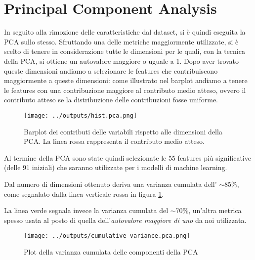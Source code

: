 \section{Principal Component Analysis}
In seguito alla rimozione delle caratteristiche dal dataset, si è quindi eseguita 
la PCA sullo stesso. 
Sfruttando una delle metriche maggiormente utilizzate, si è scelto di tenere 
in considerazione tutte le dimensioni per le quali, con la tecnica della PCA, 
si ottiene un autovalore maggiore o uguale a 1.
Dopo aver trovato queste dimensioni andiamo a selezionare le features che 
contribuiscono maggiormente a queste dimensioni: come illustrato nel barplot 
andiamo a tenere le features con una contribuzione maggiore al contributo medio 
atteso, ovvero il contributo atteso se la distribuzione delle contribuzioni fosse
uniforme.   

\begin{figure}[H]
    \centering
    \texttt{[image: ../outputs/hist.pca.png]}
    \caption{Barplot dei contributi delle variabili rispetto alle dimensioni 
    della PCA. La linea rossa rappresenta il contributo medio atteso.}
\end{figure}

Al termine della PCA sono state quindi selezionate le 55 features più 
significative (delle 91 iniziali) che saranno utilizzate per i 
modelli di machine learning.

Dal numero di dimensioni ottenuto deriva una varianza cumulata dell'
$\sim 85\%$, come segnalato dalla linea verticale rossa in figura \ref{fig:var}.

La linea verde segnala invece la varianza cumulata del $\sim 70\%$, un'altra
metrica spesso usata al posto di quella dell'\textit{autovalore maggiore di uno} 
da noi utilizzata.

\begin{figure}[H]
    \centering
    \texttt{[image: ../outputs/cumulative\_variance.pca.png]}
    \caption{Plot della varianza cumulata delle componenti della PCA}
    \label{fig:var}
\end{figure}